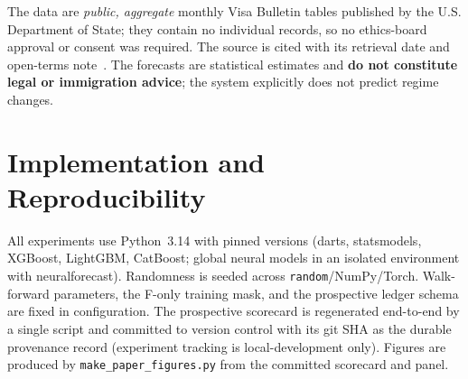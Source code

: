 \documentclass[runningheads]{llncs}
\begin{document}
The data are \emph{public, aggregate} monthly Visa Bulletin tables published by the
U.S. Department of State; they contain no individual records, so no ethics-board
approval or consent was required. The source is cited with its retrieval date and
open-terms note~\cite{statedept}. The forecasts are statistical estimates and
\textbf{do not constitute legal or immigration advice}; the system explicitly does
not predict regime changes. %

\appendix
\section{Implementation and Reproducibility}
\label{sec:repro}

All experiments use Python~3.14 with pinned versions (darts, statsmodels, XGBoost,
LightGBM, CatBoost; global neural models in an isolated environment with
neuralforecast). Randomness is seeded across \texttt{random}/NumPy/Torch. Walk-forward
parameters, the F-only training mask, and the prospective ledger schema are fixed in
configuration. The prospective scorecard is regenerated end-to-end by a single
script and committed to version control with its git SHA as the durable provenance
record (experiment tracking is local-development only). Figures are produced by
\texttt{make\_paper\_figures.py} from the committed scorecard and panel.
\end{document}
